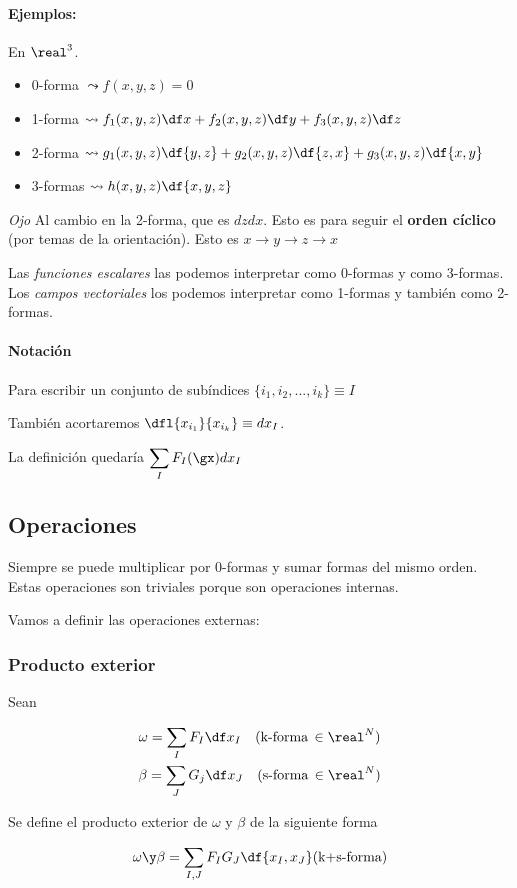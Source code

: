 \paragraph{Ejemplos:} En $\real^3$.

\begin{itemize}
\item 0-forma $\leadsto f(x,y,z) = 0$
\item 1-forma $\leadsto f_1(x,y,z)\df x + f_2(x,y,z)\df y + f_3(x,y,z)\df z$
\item 2-forma $\leadsto g_1(x,y,z)\df{y,z} + g_2(x,y,z)\df{z,x} + g_3(x,y,z)\df{x,y}$
\item 3-formas $\leadsto h(x,y,z)\df{x,y,z}$
\end{itemize}

\emph{Ojo} Al cambio en la 2-forma, que es $dzdx$. Esto es para seguir el \textbf{orden cíclico} (por temas de la orientación). Esto es $x\to y \to z \to x$


\obs Las \textit{funciones escalares} las podemos interpretar como 0-formas y como 3-formas. Los \textit{campos vectoriales} los podemos interpretar como 1-formas y también como 2-formas.

\paragraph{Notación}
Para escribir un conjunto de subíndices $\{i_1,i_2,...,i_k\} \equiv I$

También acortaremos $\dfl{x_{i_1}}{x_{i_k}} \equiv dx_I$. 

La definición quedaría $\displaystyle \sum_I F_I(\gx)dx_I$

\subsection{Operaciones}
Siempre se puede multiplicar por 0-formas y sumar formas del mismo orden. Estas operaciones son triviales porque son operaciones internas.

Vamos a definir las operaciones externas:

\subsubsection{Producto exterior}

\begin{defn}
Sean

\begin{gather*}
\omega = \sum_I F_I \df x_I\quad (\text{k-forma}\,\in\real^N) \\
\beta = \sum_J G_j \df x_J\quad (\text{s-forma}\,\in\real^N)
\end{gather*}

Se define el producto exterior de $ω$ y $β$ de la siguiente forma

\[\omega\y\beta = \sum_{I,J} F_IG_J \df{x_I,x_J} (\text{k+s-forma})\]
\end{defn}

